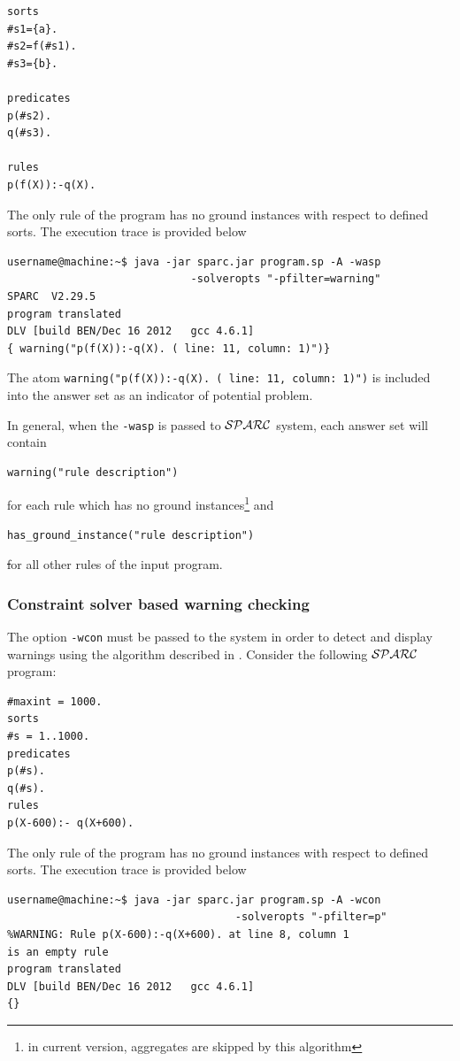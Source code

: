 \documentclass[12pt, letterpaper]{article}
\begin{document}
\begin{verbatim}
sorts
#s1={a}.
#s2=f(#s1).
#s3={b}.

predicates
p(#s2).
q(#s3).

rules
p(f(X)):-q(X).
\end{verbatim}

The only rule of the program has no ground instances with respect to defined sorts.
The execution trace is provided below
\begin{verbatim}
username@machine:~$ java -jar sparc.jar program.sp -A -wasp
                             -solveropts "-pfilter=warning"
SPARC  V2.29.5
program translated
DLV [build BEN/Dec 16 2012   gcc 4.6.1]
{ warning("p(f(X)):-q(X). ( line: 11, column: 1)")}
\end{verbatim}

The atom \texttt{warning("p(f(X)):-q(X). ( line: 11, column: 1)")} is included into the answer set as an indicator of potential problem.

In general, when the \texttt{-wasp} is passed to ${\cal SPARC}$ system, each answer set will contain 
\begin{verbatim}
warning("rule description") 
\end{verbatim}
for each rule which has no ground instances\footnote{in current version, aggregates are skipped by this algorithm} and 
\begin{verbatim}
has_ground_instance("rule description")
\end{verbatim}
\st
for all other rules of the input program.
\subsubsection{Constraint solver based warning checking}\label{clp_type_warnings}

The option \texttt{-wcon} must be passed to the  system  in order to detect and display warnings using the algorithm described in \cite{sparc}.
Consider the following ${\cal SPARC}$ program:

\begin{verbatim}
#maxint = 1000.
sorts
#s = 1..1000.
predicates
p(#s).
q(#s).
rules
p(X-600):- q(X+600).
\end{verbatim}

The only rule of the program has no ground instances with respect to defined sorts.
The execution trace is provided below
\begin{verbatim}
username@machine:~$ java -jar sparc.jar program.sp -A -wcon 
                                    -solveropts "-pfilter=p"
%WARNING: Rule p(X-600):-q(X+600). at line 8, column 1 
is an empty rule
program translated
DLV [build BEN/Dec 16 2012   gcc 4.6.1]
{}
\end{verbatim}
\end{document}
